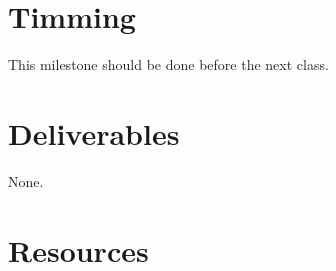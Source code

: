 \begin{enumerate}
\begin{enumerate}
  \end{enumerate}

\end{enumerate}

\section{Timming}

This milestone should be done before the next class.

\section{Deliverables}

None.

\section{Resources}


